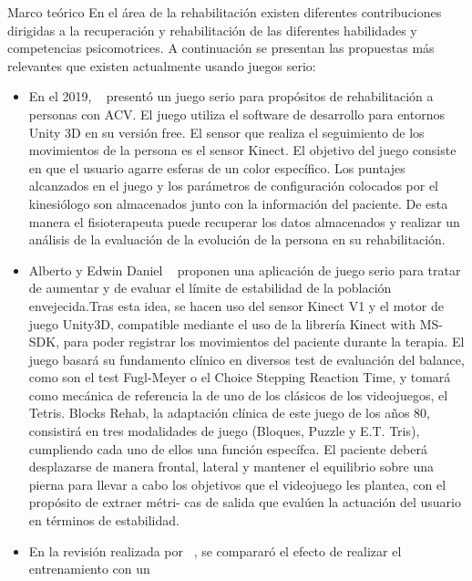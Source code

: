 \begin{thesischapter}{1} {Marco teórico}
    \vspace{10pt}
    En el área de la rehabilitación %
    existen diferentes contribuciones dirigidas a la recuperación y rehabilitación de las diferentes habilidades y competencias psicomotrices. 
    A continuación se presentan las propuestas más relevantes que existen actualmente usando juegos serio:
    \begin{itemize}
        \item En el 2019, ~\cite{rodriguez2019design} presentó un juego serio para propósitos de rehabilitación a personas con ACV. El juego 
        utiliza el software de desarrollo para entornos Unity 3D en su versión free. El sensor que realiza el seguimiento de los movimientos 
        de la persona es el sensor Kinect. El objetivo del juego consiste en que el usuario agarre esferas de un color específico. Los puntajes 
        alcanzados en el juego y los parámetros de configuración colocados por el kinesiólogo son almacenados junto con la información del paciente. 
        De esta manera el fisioterapeuta puede recuperar los datos almacenados y realizar un análisis de la evaluación de la evolución de la persona 
        en su rehabilitación.
        \item Alberto y Edwin Daniel ~\cite{morales2019desarrollo} proponen una aplicación de juego serio para tratar de aumentar y de evaluar 
        el límite de estabilidad de la población envejecida.Tras esta idea, se hacen uso del sensor Kinect V1 y el 
        motor de juego Unity3D, compatible mediante el uso de la librería Kinect with MS-SDK, para poder registrar los movimientos del paciente durante 
        la terapia. El juego basará su fundamento clínico en diversos test de evaluación del balance, como son el test Fugl-Meyer o el Choice Stepping 
        Reaction Time, y tomará como mecánica de referencia la de uno de los clásicos de los videojuegos, el Tetris. Blocks Rehab, la adaptación clínica 
        de este juego de los años 80, consistirá en tres modalidades de juego (Bloques, Puzzle y E.T. Tris), cumpliendo cada uno de ellos una función específca. 
        El paciente deberá desplazarse de manera frontal, lateral y mantener el equilibrio sobre una pierna para llevar a cabo los objetivos que el 
        videojuego les plantea, con el propósito de extraer métri- cas de salida que evalúen la actuación del usuario en términos de estabilidad. 
        \item En la revisión realizada por ~\cite{doi:10.1177/1545968314535985}, se compararó el efecto de realizar el entrenamiento con un

\end{itemize}
\end{thesischapter}
